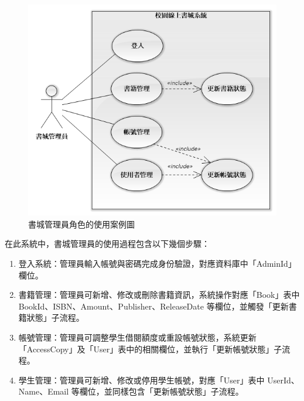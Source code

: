 \begin{figure}[ht]
    \centering
    \includegraphics[width=\linewidth]{image/使用案例：書城管理員.png}
    \captionsetup{justification=centering}
    \caption{書城管理員角色的使用案例圖}
\end{figure}

在此系統中，書城管理員的使用過程包含以下幾個步驟：
\begin{enumerate}
    \item 登入系統：管理員輸入帳號與密碼完成身份驗證，對應資料庫中「AdminId」欄位。
    \item 書籍管理：管理員可新增、修改或刪除書籍資訊，系統操作對應「Book」表中 BookId、ISBN、Amount、Publisher、ReleaseDate 等欄位，並觸發「更新書籍狀態」子流程。
    \item 帳號管理：管理員可調整學生借閱額度或重設帳號狀態，系統更新「AccessCopy」及「User」表中的相關欄位，並執行「更新帳號狀態」子流程。
    \item 學生管理：管理員可新增、修改或停用學生帳號，對應「User」表中 UserId、Name、Email 等欄位，並同樣包含「更新帳號狀態」子流程。
\end{enumerate}

